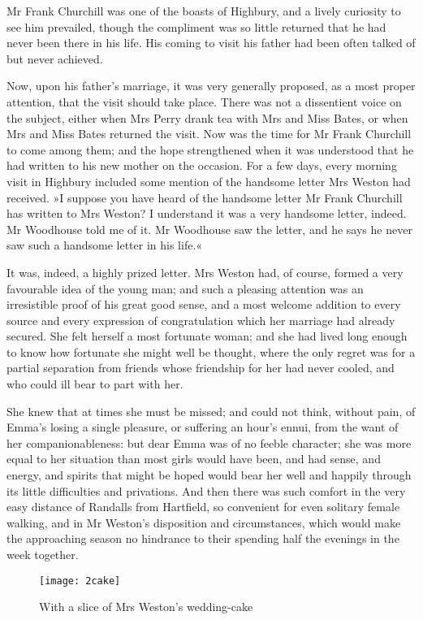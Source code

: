 Mr Frank Churchill was one of the boasts of Highbury, and a lively curiosity to see him prevailed, though the compliment was so little returned that he had never been there in his life. His coming to visit his father had been often talked of but never achieved.

Now, upon his father's marriage, it was very generally proposed, as a most proper attention, that the visit should take place. There was not a dissentient voice on the subject, either when Mrs Perry drank tea with Mrs and Miss Bates, or when Mrs and Miss Bates returned the visit. Now was the time for Mr Frank Churchill to come among them; and the hope strengthened when it was understood that he had written to his new mother on the occasion. For a few days, every morning visit in Highbury included some mention of the handsome letter Mrs Weston had received. »I suppose you have heard of the handsome letter Mr Frank Churchill has written to Mrs Weston? I understand it was a very handsome letter, indeed. Mr Woodhouse told me of it. Mr Woodhouse saw the letter, and he says he never saw such a handsome letter in his life.«

It was, indeed, a highly prized letter. Mrs Weston had, of course, formed a very favourable idea of the young man; and such a pleasing attention was an irresistible proof of his great good sense, and a most welcome addition to every source and every expression of congratulation which her marriage had already secured. She felt herself a most fortunate woman; and she had lived long enough to know how fortunate she might well be thought, where the only regret was for a partial separation from friends whose friendship for her had never cooled, and who could ill bear to part with her.

She knew that at times she must be missed; and could not think, without pain, of Emma's losing a single pleasure, or suffering an hour's ennui, from the want of her companionableness: but dear Emma was of no feeble character; she was more equal to her situation than most girls would have been, and had sense, and energy, and spirits that might be hoped would bear her well and happily through its little difficulties and privations. And then there was such comfort in the very easy distance of Randalls from Hartfield, so convenient for even solitary female walking, and in Mr Weston's disposition and circumstances, which would make the approaching season no hindrance to their spending half the evenings in the week together.

\begin{figure}[tbph]
\centering
\texttt{[image: 2cake]}
\caption{With a slice of Mrs Weston's wedding-cake}
\end{figure}

